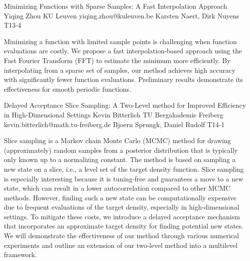 \begin{talk}
  {Minimizing Functions with Sparse Samples: A Fast Interpolation Approach
}%
  {Yiqing Zhou}%
  {KU Leuven}%
  {yiqing.zhou@kuleuven.be}%
  {Karsten Naert, Dirk Nuyens}%
  {T13-4}%
			
Minimizing a function with limited sample points is challenging when function evaluations are costly. We propose a fast interpolation-based approach using the Fast Fourier Transform (FFT) to estimate the minimum more efficiently. By interpolating from a sparse set of samples, our method achieves high accuracy with significantly fewer function evaluations. Preliminary results demonstrate its effectiveness for smooth periodic functions.
\end{talk}

\begin{talk}
  {Delayed Acceptance Slice Sampling: A Two-Level method for Improved Efficiency in High-Dimensional Settings}%
  {Kevin Bitterlich}%
  {TU Bergakademie Freiberg}%
  {kevin.bitterlich@math.tu-freiberg.de}%
  {Bjoern Sprungk, Daniel Rudolf}%
  {T14-1}%
			
Slice sampling is a Markov chain Monte Carlo (MCMC) method for drawing (approximately) random samples from a posterior distribution that 
is typically only known up to a normalizing constant. 
The method is based on sampling a new state on a slice, i.e., a level set of the target density function. 
Slice sampling is especially interesting because it is tuning-free and guarantees a move to a new state, which can 
result in a lower autocorrelation compared to other MCMC methods. 
However, finding such a new state can be computationally expensive due to frequent evaluations of the target density, 
especially in high-dimensional settings. 
To mitigate these costs, we introduce a delayed acceptance mechanism that incorporates an approximate target density for finding potential 
new states. We will demonstrate the effectiveness of our method through various numerical experiments and outline an extension of our two-level method into a multilevel framework.


\end{talk}

